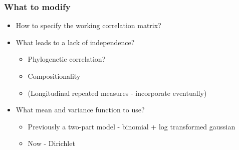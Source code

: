 \documentclass{beamer}
\begin{document}
\begin{frame}
\frametitle{What to modify}
\begin{itemize}
  \item How to specify the working correlation matrix?
  \item What leads to a lack of independence?
  \begin{itemize}
    \item Phylogenetic correlation?
    \item Compositionality
    \item (Longitudinal repeated measures - incorporate eventually)
  \end{itemize}
  \item What mean and variance function to use?
  \begin{itemize}
    \item Previously a two-part model - binomial + log transformed gaussian
    \item Now - Dirichlet
  \end{itemize}
\end{itemize}
\end{frame}
\end{document}
